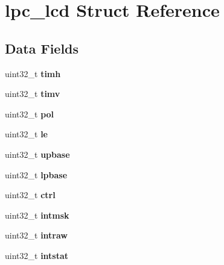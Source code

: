 \hypertarget{structlpc__lcd}{}\section{lpc\+\_\+lcd Struct Reference}
\label{structlpc__lcd}
\subsection*{Data Fields}
\begin{DoxyCompactItemize}
\item 
\mbox{\label{structlpc__lcd_a067000ebba2b1d14ebd569f05d27cd3b}} 
uint32\+\_\+t {\bfseries timh}
\item 
\mbox{\label{structlpc__lcd_a1e927c70b6c01c84c05b5d97099b2a4e}} 
uint32\+\_\+t {\bfseries timv}
\item 
\mbox{\label{structlpc__lcd_a7730dd4bb604167be6060a640f76b5d7}} 
uint32\+\_\+t {\bfseries pol}
\item 
\mbox{\label{structlpc__lcd_af8682582a10e3194efc0939bea1c7004}} 
uint32\+\_\+t {\bfseries le}
\item 
\mbox{\label{structlpc__lcd_ad8bc083ade2dbadd585103fafbac5e68}} 
uint32\+\_\+t {\bfseries upbase}
\item 
\mbox{\label{structlpc__lcd_a9618d05463d9039edcfea1bc4eb5d25d}} 
uint32\+\_\+t {\bfseries lpbase}
\item 
\mbox{\label{structlpc__lcd_a4cc682dd0d764114e6df131db9864e55}} 
uint32\+\_\+t {\bfseries ctrl}
\item 
\mbox{\label{structlpc__lcd_afcc94b70d1dfcf83f799eb3ed296730e}} 
uint32\+\_\+t {\bfseries intmsk}
\item 
\mbox{\label{structlpc__lcd_a375b27b35f17a29bcaa38b402f52eb10}} 
uint32\+\_\+t {\bfseries intraw}
\item 
\mbox{\label{structlpc__lcd_a4625d0328f566ca34ede6f56a22e91e3}} 
uint32\+\_\+t {\bfseries intstat}
\item 

\end{DoxyCompactItemize}
